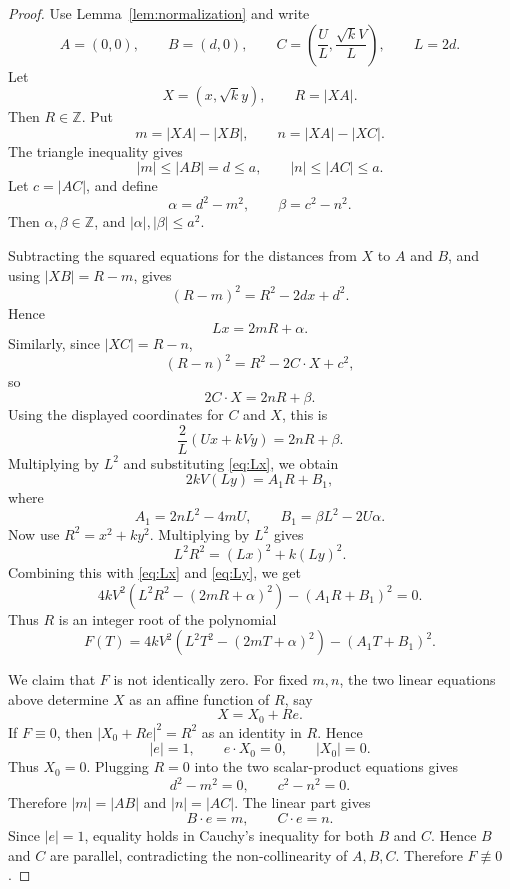 \documentclass[11pt]{article}
\newcommand{\ZZ}{\mathbb Z}
\begin{document}
\begin{proof}
Use Lemma~\ref{lem:normalization} and write
\[
        A=(0,0),\qquad B=(d,0),\qquad
        C=\left(\frac{U}{L},\frac{\sqrt{k}V}{L}\right),
        \qquad L=2d.
\]
Let
\[
        X=(x,\sqrt{k}y),
        \qquad R=|XA|.
\]
Then \(R\in\ZZ\).  Put
\[
        m=|XA|-|XB|,
        \qquad n=|XA|-|XC|.
\]
The triangle inequality gives
\[
        |m|\le |AB|=d\le a,
        \qquad |n|\le |AC|\le a.
\]
Let \(c=|AC|\), and define
\[
        \alpha=d^2-m^2,
        \qquad \beta=c^2-n^2.
\]
Then \(\alpha,\beta\in\ZZ\), and \(|\alpha|,|\beta|\le a^2\).

Subtracting the squared equations for the distances from \(X\) to \(A\) and
\(B\), and using \(|XB|=R-m\), gives
\[
        (R-m)^2=R^2-2dx+d^2.
\]
Hence
\begin{equation}\label{eq:Lx}
        Lx=2mR+\alpha .
\end{equation}
Similarly, since \(|XC|=R-n\),
\[
        (R-n)^2=R^2-2C\cdot X+c^2,
\]
so
\[
        2C\cdot X=2nR+\beta.
\]
Using the displayed coordinates for \(C\) and \(X\), this is
\[
        \frac{2}{L}(Ux+kVy)=2nR+\beta.
\]
Multiplying by \(L^2\) and substituting \eqref{eq:Lx}, we obtain
\begin{equation}\label{eq:Ly}
        2kV(Ly)=A_1R+B_1,
\end{equation}
where
\[
        A_1=2nL^2-4mU,
        \qquad
        B_1=\beta L^2-2U\alpha .
\]
Now use \(R^2=x^2+ky^2\).  Multiplying by \(L^2\) gives
\[
        L^2R^2=(Lx)^2+k(Ly)^2.
\]
Combining this with \eqref{eq:Lx} and \eqref{eq:Ly}, we get
\begin{equation}\label{eq:triplepoly}
        4kV^2\left(L^2R^2-(2mR+\alpha)^2\right)
        -(A_1R+B_1)^2=0.
\end{equation}
Thus \(R\) is an integer root of the polynomial
\[
        F(T)=4kV^2\left(L^2T^2-(2mT+\alpha)^2\right)-(A_1T+B_1)^2.
\]

We claim that \(F\) is not identically zero.  For fixed \(m,n\), the two
linear equations above determine \(X\) as an affine function of \(R\), say
\[
        X=X_0+Re.
\]
If \(F\equiv0\), then \(|X_0+Re|^2=R^2\) as an identity in \(R\).  Hence
\[
        |e|=1,
        \qquad e\cdot X_0=0,
        \qquad |X_0|=0.
\]
Thus \(X_0=0\).  Plugging \(R=0\) into the two scalar-product equations gives
\[
        d^2-m^2=0,
        \qquad c^2-n^2=0.
\]
Therefore \(|m|=|AB|\) and \(|n|=|AC|\).  The linear part gives
\[
        B\cdot e=m,
        \qquad C\cdot e=n.
\]
Since \(|e|=1\), equality holds in Cauchy's inequality for both \(B\) and
\(C\).  Hence \(B\) and \(C\) are parallel, contradicting the non-collinearity
of \(A,B,C\).  Therefore \(F\not\equiv0\).


\end{proof}
\end{document}
